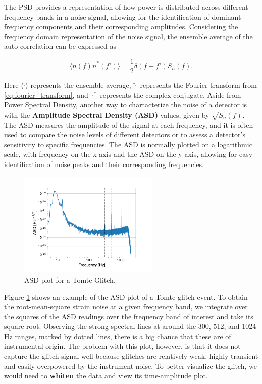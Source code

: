 \documentclass[12pt]{article}
\begin{document}
\medskip
\noindent The PSD provides a representation of how power is distributed across different frequency bands in a noise signal\cite{Oppenheim_2009, Li:2013lza}, allowing for the identification of dominant frequency components and their corresponding amplitudes. Considering the frequency domain representation of the noise signal, the ensemble average of the auto-correlation can be expressed as

\begin{equation}
  \langle \tilde{n}(f) \tilde{n}^*(f') \rangle = \frac{1}{2} \delta(f - f') S_n(f).
  \label{eq:psd_relation}
\end{equation}

\medskip
\noindent Here $\langle \cdot \rangle$ represents the ensemble average, $\tilde{\cdot}$ represents the Fourier transform from \ref{eq:fourier_transform}, and $\cdot^\ast$ represents the complex conjugate. Aside from Power Spectral Density, another way to chartacterize the noise of a detector is with the \textbf{Amplitude Spectral Density (ASD)} values, given by $\sqrt{S_n(f)}$. The ASD measures the amplitude of the signal at each frequency, and it is often used to compare the noise levels of different detectors or to assess a detector's sensitivity to specific frequencies. The ASD is normally plotted on a logarithmic scale, with frequency on the x-axis and the ASD on the y-axis, allowing for easy identification of noise peaks and their corresponding frequencies.

\begin{figure}[H]
  \centering
  \includegraphics[width=0.6\textwidth]{images/unwhitened_asd.pdf}
  \caption{ASD plot for a Tomte Glitch.}
  \label{fig:asdtomte}
\end{figure}

\medskip
\noindent Figure \ref{fig:asdtomte} shows an example of the ASD plot of a Tomte glitch event. To obtain the root-mean-square strain noise at a given frequency band, we integrate over the squares of the ASD readings over the frequency band of interest and take its square root. Observing the strong spectral lines at around the 300, 512, and 1024 Hz ranges, marked by dotted lines, there is a big chance that these are of instrumental origin. The problem with this plot, however, is that it does not capture the glitch signal well because glitches are relatively weak, highly transient and easily overpowered by the instrument noise. To better visualize the glitch, we would need to \textbf{whiten} the data and view its time-amplitude plot.
\end{document}
